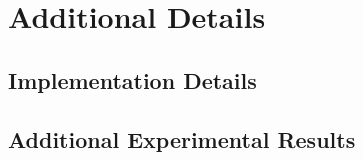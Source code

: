 \section{Additional Details}

\subsection{Implementation Details}

\subsection{Additional Experimental Results}
